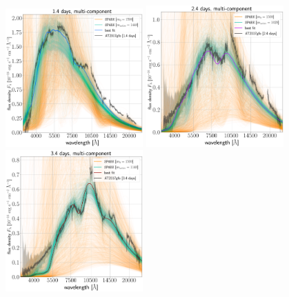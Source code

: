 \documentclass[twocolumn,twocolappendix]{aastex63}
\begin{document}
{{{{{{{{\begin{figure}[!ht]
\end{figure}

\begin{figure}[!ht]
    \centering
    \includegraphics[width=0.47\textwidth]{figs/appendix/all-spec/230726_113032_single_all_TARDIS_evals_mactive-1440_m0-1500.png}
    \includegraphics[width=0.47\textwidth]{figs/appendix/all-spec/230412_035244_single_all_TARDIS_evals_mactive-1020_m0-1500.png}
    \includegraphics[width=0.47\textwidth]{figs/appendix/all-spec/230626_073230_single_all_TARDIS_evals_mactive-1140_m0-1500.png}

\end{figure}}}}}}}}}
\end{document}
